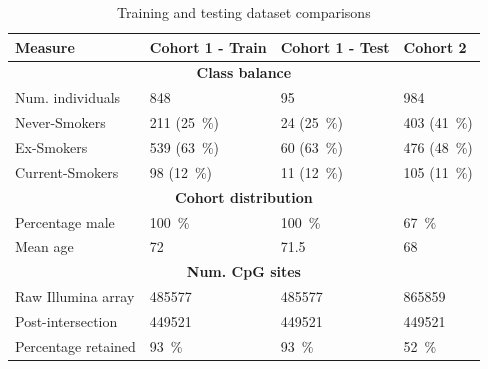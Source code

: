 \documentclass{article} %
\begin{document}
\begin{table}
    \caption{Training and testing dataset comparisons} \label{table:dataset-compare-internal}
    \begin{tabularx}{\textwidth}{X >{\raggedleft\arraybackslash}X >{\raggedleft\arraybackslash}X >{\raggedleft\arraybackslash}X}
        \toprule
        \textbf{Measure}    & \textbf{Cohort 1 - Train}     & \textbf{Cohort 1 - Test}     & \textbf{Cohort 2}             \\
        \midrule
        \multicolumn{4}{c}{\textbf{Class balance}}                                                                         \\
        \midrule
        Num. individuals    & \num{848}                     & \num{95}                     & \num{984}                     \\
        \addlinespace
        Never-Smokers       & \num{211} (\SI{25}{\percent}) & \num{24} (\SI{25}{\percent}) & \num{403} (\SI{41}{\percent}) \\
        \addlinespace
        Ex-Smokers          & \num{539} (\SI{63}{\percent}) & \num{60} (\SI{63}{\percent}) & \num{476} (\SI{48}{\percent}) \\
        \addlinespace
        Current-Smokers     & \num{98} (\SI{12}{\percent})  & \num{11} (\SI{12}{\percent}) & \num{105} (\SI{11}{\percent}) \\
        \midrule
        \multicolumn{4}{c}{\textbf{Cohort distribution}}                                                                   \\
        \midrule
        Percentage male     & \SI{100}{\percent}            & \SI{100}{\percent}           & \SI{67}{\percent}             \\
        Mean age            & \num{72}                      & \num{71.5}                   & \num{68}                      \\
        \midrule
        \multicolumn{4}{c}{\textbf{Num. CpG sites}}                                                                        \\
        \midrule
        Raw Illumina array  & \num{485577}                  & \num{485577}                 & \num{865859}                  \\
        Post-intersection   & \num{449521}                  & \num{449521}                 & \num{449521}                  \\
        Percentage retained & \SI{93}{\percent}             & \SI{93}{\percent}            & \SI{52}{\percent}             \\
        \bottomrule
    \end{tabularx}
\end{table}
\end{document}

